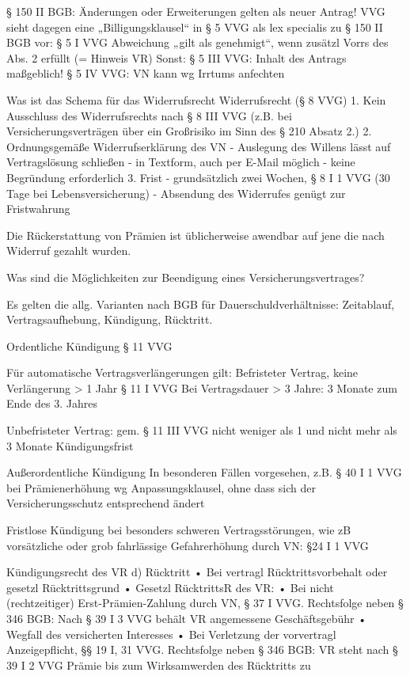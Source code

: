 § 150 II BGB: Änderungen oder Erweiterungen gelten als neuer Antrag!
VVG sieht dagegen eine „Billigungsklausel“ in § 5 VVG als lex specialis zu § 150 II BGB vor:
§ 5 I VVG Abweichung „gilt als genehmigt“, wenn zusätzl Vorrs des Abs. 2 erfüllt (= Hinweis VR)
Sonst: § 5 III VVG: Inhalt des Antrags maßgeblich!
§ 5 IV VVG: VN kann wg Irrtums anfechten


Was ist das Schema für das Widerrufsrecht
Widerrufsrecht (§ 8 VVG)
1. Kein Ausschluss des Widerrufsrechts nach § 8 III VVG (z.B. bei Versicherungsverträgen über ein Großrisiko im Sinn des § 210 Absatz 2.)
2. Ordnungsgemäße Widerrufserklärung des VN
   - Auslegung des Willens lässt auf Vertragslösung schließen
   - in Textform, auch per E-Mail möglich
   - keine Begründung erforderlich
3. Frist
   - grundsätzlich zwei Wochen, § 8 I 1 VVG (30 Tage bei Lebensversicherung)
   - Absendung des Widerrufes genügt zur Fristwahrung

Die Rückerstattung von Prämien ist üblicherweise awendbar auf jene die nach Widerruf gezahlt wurden.



Was sind die Möglichkeiten zur Beendigung eines Versicherungsvertrages?

Es gelten die allg. Varianten nach BGB für Dauerschuldverhältnisse: 
Zeitablauf, Vertragsaufhebung, Kündigung, Rücktritt.

Ordentliche Kündigung § 11 VVG

Für automatische Vertragsverlängerungen gilt: 
Befristeter Vertrag, keine Verlängerung > 1 Jahr § 11 I VVG
Bei Vertragsdauer > 3 Jahre: 3 Monate zum Ende des 3. Jahres

Unbefristeter Vertrag: gem. § 11 III VVG nicht weniger als 1 und nicht mehr
als 3 Monate Kündigungsfrist

Außerordentliche Kündigung
In besonderen Fällen vorgesehen, z.B. § 40 I 1 VVG bei Prämienerhöhung
wg Anpassungsklausel, ohne dass sich der Versicherungsschutz
entsprechend ändert

Fristlose Kündigung bei besonders schweren Vertragsstörungen, wie zB
vorsätzliche oder grob fahrlässige Gefahrerhöhung durch VN: §24 I 1 VVG

Kündigungsrecht des VR
d) Rücktritt
• Bei vertragl Rücktrittsvorbehalt oder gesetzl Rücktrittsgrund
• Gesetzl RücktrittsR des VR:
• Bei nicht (rechtzeitiger) Erst-Prämien-Zahlung durch VN, § 37 I VVG.
Rechtsfolge neben § 346 BGB: Nach § 39 I 3 VVG behält VR angemessene
Geschäftsgebühr
• Wegfall des versicherten Interesses
• Bei Verletzung der vorvertragl Anzeigepflicht, §§ 19 I, 31 VVG.
Rechtsfolge neben § 346 BGB: VR steht nach § 39 I 2 VVG Prämie bis zum
Wirksamwerden des Rücktritts zu



